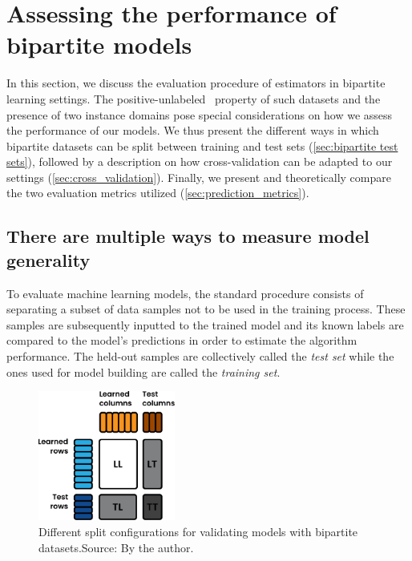 \section{Assessing the performance of bipartite models}
\label{sec:evaluation}

In this section, we discuss the evaluation procedure of estimators in bipartite learning settings. 
The positive-unlabeled~\cite{bekker2020learning} property of such datasets and the presence of two instance domains pose special considerations on how we assess the performance of our models.
We thus present the different ways in which bipartite datasets can be split between training and test sets (\autoref{sec:bipartite test sets}), followed by a description on how cross-validation can be adapted to our settings (\autoref{sec:cross_validation}).
Finally, we present and theoretically compare the two evaluation metrics utilized (\autoref{sec:prediction_metrics}).



\subsection{There are multiple ways to measure model generality}
\label{sec:bipartite test sets}


To evaluate machine learning models, the standard procedure consists of separating a subset of data samples not to be used in the training process. These samples are subsequently inputted to the trained model and its known labels are compared to the model's predictions in order to estimate the algorithm performance. The held-out samples are collectively called the \emph{test set} while the ones used for model building are called the \emph{training set}.

\begin{figure}
    \centering
    \includegraphics[width=0.4\textwidth]{figures/train_test_split.pdf}
    \caption{Different split configurations for validating models with bipartite datasets.\newline Source: By the author.}
    \label{fig:bipartite test sets}
\end{figure}


